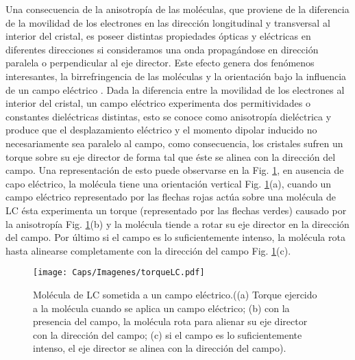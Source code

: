 Una consecuencia de la anisotropía de las moléculas, que proviene de la diferencia de la movilidad de los electrones en las dirección longitudinal y transversal al interior del cristal, es poseer distintas propiedades ópticas y eléctricas en diferentes direcciones si consideramos una onda propagándose en dirección paralela o perpendicular al eje director. Este efecto genera dos fenómenos interesantes, la birrefringencia de las moléculas y la orientación bajo la influencia de un campo eléctrico \cite{Uribe2011, Burman2010}. Dada la diferencia entre la movilidad de los electrones al interior del cristal, un campo eléctrico experimenta dos permitividades o constantes dieléctricas distintas, esto se conoce como anisotropía dieléctrica y produce que el desplazamiento eléctrico y el momento dipolar inducido no necesariamente sea paralelo al campo, como consecuencia, los cristales sufren un torque sobre su eje director de forma tal que éste se alinea con la dirección del campo. Una representación de esto puede observarse en la Fig. \ref{fig:torqueLC}, en ausencia de capo eléctrico, la molécula tiene una orientación vertical Fig. \ref{fig:torqueLC}(a), cuando un campo eléctrico representado por las flechas rojas actúa sobre una molécula de LC ésta experimenta un torque (representado por las flechas verdes) causado por la anisotropía Fig. \ref{fig:torqueLC}(b) y la molécula tiende a rotar su eje director en la dirección del campo. Por último si el campo es lo suficientemente intenso, la molécula rota hasta alinearse completamente con la dirección del campo Fig. \ref{fig:torqueLC}(c). \\

\begin{figure}[!ht]
  \centering
    \texttt{[image: Caps/Imagenes/torqueLC.pdf]}
  \caption[Molécula de LC sometida a un campo eléctrico]{Molécula de LC sometida a un campo eléctrico.((a) Torque ejercido a la molécula cuando se aplica un campo eléctrico; (b) con la presencia del campo, la molécula rota para alienar su eje director con la dirección del campo; (c) si el campo es lo suficientemente intenso, el eje director se alinea con la dirección del campo).}
  \label{fig:torqueLC}
\end{figure}


